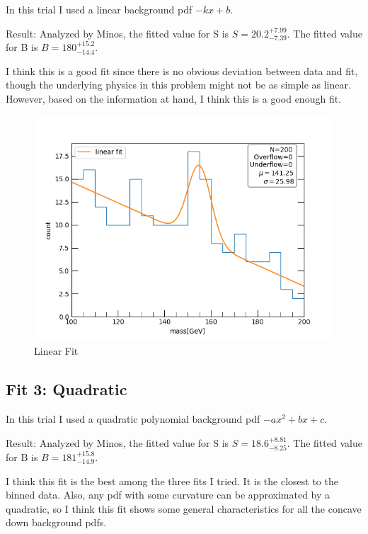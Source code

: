 \documentclass[]{article}
\begin{document}
In this trial I used a linear background pdf \(-kx+b\).

Result: Analyzed by Minos, the fitted value for S is
\(S = 20.2^{+ 7.99}_{-7.39}\). The fitted value for B is
\(B=180^{+15.2}_{-14.4}\).

I think this is a good fit since there is no obvious deviation between
data and fit, though the underlying physics in this problem might not be
as simple as linear. However, based on the information at hand, I think
this is a good enough fit.

\begin{figure}
\centering
\includegraphics{./ex1_figs/Fit2_linear.png}
\caption{Linear Fit}
\end{figure}

\subsection{Fit 3: Quadratic}\label{fit-3-quadratic}

In this trial I used a quadratic polynomial background pdf
\(-ax^2 +bx+c\).

Result: Analyzed by Minos, the fitted value for S is
\(S = 18.6^{+ 8.81}_{-8.25}\). The fitted value for B is
\(B=181^{+15.8}_{-14.9}\).

I think this fit is the best among the three fits I tried. It is the
closest to the binned data. Also, any pdf with some curvature can be
approximated by a quadratic, so I think this fit shows some general
characteristics for all the concave down background pdfs.
\end{document}
